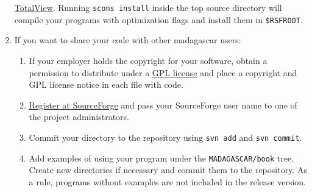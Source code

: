 \begin{enumerate}
  \href{http://www.etnus.com/}{TotalView}. Running \texttt{scons
    install} inside the top source directory will compile your
  programs with optimization flags and install them in
  \texttt{\$RSFROOT}.
\item If you want to share your code with other madagascar users:
\begin{enumerate}
\item If your employer holds the copyright for your software, obtain a
  permission to distribute under a
  \href{http://www.gnu.org/copyleft/gpl.html}{GPL license} and place a
  copyright and GPL license notice in each file with code.
\item
  \href{http://sourceforge.net/account/newuser_emailverify.php}{Register
    at SourceForge} and pass your SourceForge user name to one of the
  project administrators.  \item Commit your directory to the
  repository using \texttt{svn add} and \texttt{svn commit}.  \item
  Add examples of using your program under the
  \texttt{MADAGASCAR/book} tree. Create new directories if necessary
  and commit them to the repository. As a rule, programs without
  examples are not included in the release version.
\end{enumerate}
\end{enumerate}
